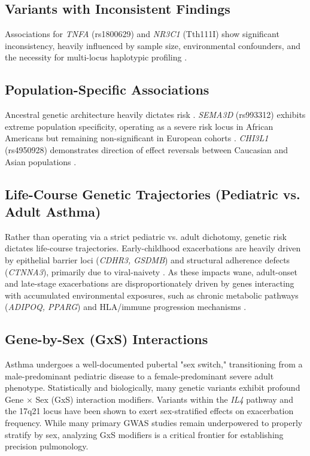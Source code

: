 \documentclass[11pt,a4paper]{article}
\begin{document}
\subsection{Variants with Inconsistent Findings}
Associations for \textit{TNFA} (rs1800629) and \textit{NR3C1} (Tth111I) show significant inconsistency, heavily influenced by sample size, environmental confounders, and the necessity for multi-locus haplotypic profiling \cite{AlAhmadAli2025, ChengDai2016}.

\subsection{Population-Specific Associations}
Ancestral genetic architecture heavily dictates risk \cite{DayaRafaels2017, WashingtonDapas2022, HernandezPachecoMeln2022}. \textit{SEMA3D} (rs993312) exhibits extreme population specificity, operating as a severe risk locus in African Americans but remaining non-significant in European cohorts \cite{McGeachieWu2015}. \textit{CHI3L1} (rs4950928) demonstrates direction of effect reversals between Caucasian and Asian populations \cite{ShaoYang2019, HansenThomsen2015}.

\subsection{Life-Course Genetic Trajectories (Pediatric vs. Adult Asthma)}
Rather than operating via a strict pediatric vs. adult dichotomy, genetic risk dictates life-course trajectories. Early-childhood exacerbations are heavily driven by epithelial barrier loci (\textit{CDHR3, GSDMB}) and structural adherence defects (\textit{CTNNA3}), primarily due to viral-naivety \cite{EliasenPedersen2022, PividoriSchoettler2018}. As these impacts wane, adult-onset and late-stage exacerbations are disproportionately driven by genes interacting with accumulated environmental exposures, such as chronic metabolic pathways (\textit{ADIPOQ, PPARG}) and HLA/immune progression mechanisms \cite{RnnebjergAxelsson2021, KanazawaKitazawa2019}.

\subsection{Gene-by-Sex (GxS) Interactions}
Asthma undergoes a well-documented pubertal "sex switch," transitioning from a male-predominant pediatric disease to a female-predominant severe adult phenotype. Statistically and biologically, many genetic variants exhibit profound Gene $\times$ Sex (GxS) interaction modifiers. Variants within the \textit{IL4} pathway and the 17q21 locus have been shown to exert sex-stratified effects on exacerbation frequency. While many primary GWAS studies remain underpowered to properly stratify by sex, analyzing GxS modifiers is a critical frontier for establishing precision pulmonology.
\end{document}
